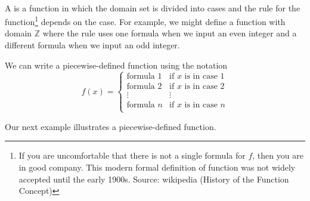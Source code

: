 \begin{defn}
\label{defn_piecewise_defined_function}
~
    \begin{apart}
        \item A  is a function in which the domain set is divided into cases and the rule for the function\footnote{If you are uncomfortable that there is not a single formula for $f$, then you are in good company. This modern formal definition of function was not widely accepted until the early 1900s. Source: wikipedia (History of the Function Concept)} depends on the case. For example, we might define a function with domain $\mathbb{Z}$ where the rule uses one formula when we input an even integer and a different formula when we input an odd integer. 
        \item We can write a piecewise-defined function using the notation
        $$f(x) = \left\{ \begin{array} {cl}
            \text{formula 1} & \text{if } x \text{ is in case 1} \\
            \text{formula 2} & \text{if } x \text{ is in case 2} \\
            \vdots & \vdots \\
            \text{formula } n & \text{if } x \text{ is in case } n \\
        \end{array} \right.$$ 
    \end{apart}
\end{defn}

Our next example illustrates a piecewise-defined function.

